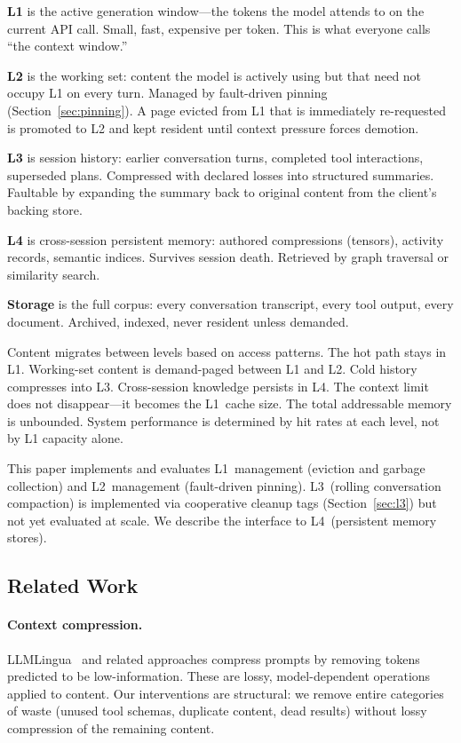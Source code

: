 \textbf{L1} is the active generation window---the tokens the model
attends to on the current API call. Small, fast, expensive per
token. This is what everyone calls ``the context window.''

\textbf{L2} is the working set: content the model is actively using
but that need not occupy L1 on every turn. Managed by fault-driven
pinning (Section~\ref{sec:pinning}). A page evicted from L1 that is
immediately re-requested is promoted to L2 and kept resident until
context pressure forces demotion.

\textbf{L3} is session history: earlier conversation turns,
completed tool interactions, superseded plans. Compressed with
declared losses into structured summaries. Faultable by expanding
the summary back to original content from the client's backing
store.

\textbf{L4} is cross-session persistent memory: authored
compressions (tensors), activity records, semantic indices. Survives
session death. Retrieved by graph traversal or similarity search.

\textbf{Storage} is the full corpus: every conversation transcript,
every tool output, every document. Archived, indexed, never resident
unless demanded.

Content migrates between levels based on access patterns. The hot
path stays in L1. Working-set content is demand-paged between L1 and
L2. Cold history compresses into L3. Cross-session knowledge
persists in L4. The context limit does not disappear---it becomes
the L1~cache size. The total addressable memory is unbounded. System
performance is determined by hit rates at each level, not by L1
capacity alone.

This paper implements and evaluates L1~management (eviction and
garbage collection) and L2~management (fault-driven pinning).
L3~(rolling conversation compaction) is implemented via cooperative
cleanup tags (Section~\ref{sec:l3}) but not yet evaluated at scale.
We describe the interface to L4~(persistent memory stores).

\subsection{Related Work}
\label{sec:related}

\paragraph{Context compression.}
LLMLingua~\citep{jiang2024longllmlingua} and related approaches compress
prompts by removing tokens predicted to be low-information. These
are lossy, model-dependent operations applied to content. Our
interventions are structural: we remove entire categories of waste
(unused tool schemas, duplicate content, dead results) without lossy
compression of the remaining content.

